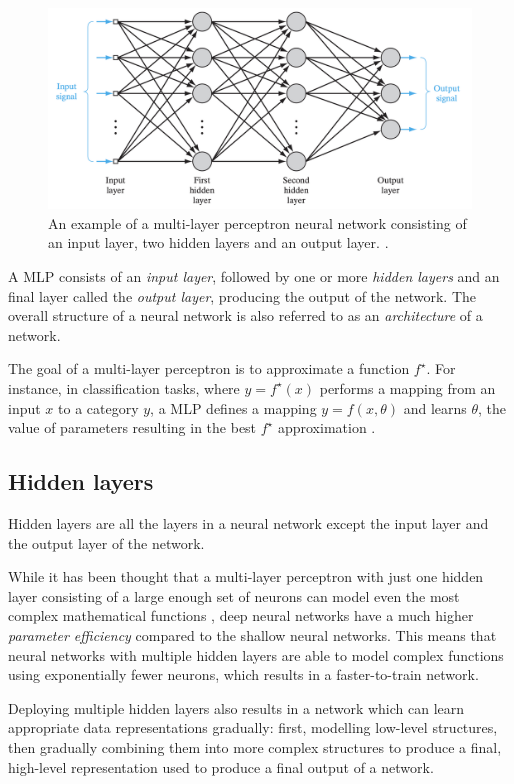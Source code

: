 \begin{figure}[]
\centering
\includegraphics[scale=0.35]{figures/mlp.png}
\caption{An example of a multi-layer perceptron neural network consisting of an input layer, two hidden layers and an output layer. \cite{haykin_nn}.}
\end{figure}
A MLP consists of an \emph{input layer}, followed by one or more \emph{hidden layers} and an final layer called the \emph{output layer}, producing the output of the network. The overall structure of a neural network is also referred to as an \emph{architecture} of a network.

The goal of a multi-layer perceptron is to approximate a function $f^\star$. For instance, in classification tasks, where $y = f^\star(x)$ performs a mapping from an input $x$ to a category $y$, a MLP defines a mapping $y = f(x, \theta)$ and learns $\theta$, the value of parameters resulting in the best $f^\star$ approximation \cite{goodfellow}.

\subsection{Hidden layers}

Hidden layers are all the layers in a neural network except the input layer and the output layer of the network.

While it has been thought that a multi-layer perceptron with just one hidden layer consisting of a large enough set of neurons can model even the most complex mathematical functions \cite{handson_geron}, deep neural networks have a much higher \emph{parameter efficiency} compared to the shallow neural networks. This means that neural networks with multiple hidden layers are able to model complex functions using exponentially fewer neurons, which results in a faster-to-train network.

Deploying multiple hidden layers also results in a network which can learn appropriate data representations gradually: first, modelling low-level structures, then gradually combining them into more complex structures to produce a final, high-level representation used to produce a final output of a network. 

